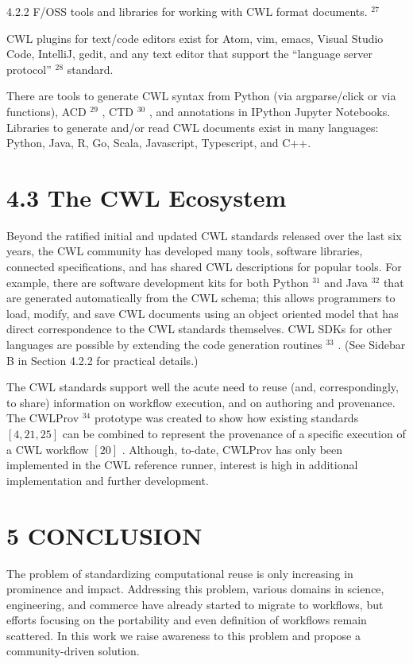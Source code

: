 \documentclass[
]{article}
\begin{document}
4.2.2 F/OSS tools and libraries for working with CWL format documents.
\(^{27}\)

CWL plugins for text/code editors exist for Atom, vim, emacs, Visual
Studio Code, IntelliJ, gedit, and any text editor that support the
``language server protocol'' \(^{28}\) standard.

There are tools to generate CWL syntax from Python (via argparse/click
or via functions), ACD \(^{29}\) , CTD \(^{30}\) , and annotations in
IPython Jupyter Notebooks. Libraries to generate and/or read CWL
documents exist in many languages: Python, Java, R, Go, Scala,
Javascript, Typescript, and C++.

\section{4.3 The CWL Ecosystem}\label{the-cwl-ecosystem}

Beyond the ratified initial and updated CWL standards released over the
last six years, the CWL community has developed many tools, software
libraries, connected specifications, and has shared CWL descriptions for
popular tools. For example, there are software development kits for both
Python \(^{31}\) and Java \(^{32}\) that are generated automatically
from the CWL schema; this allows programmers to load, modify, and save
CWL documents using an object oriented model that has direct
correspondence to the CWL standards themselves. CWL SDKs for other
languages are possible by extending the code generation routines
\(^{33}\) . (See Sidebar B in Section 4.2.2 for practical details.)

The CWL standards support well the acute need to reuse (and,
correspondingly, to share) information on workflow execution, and on
authoring and provenance. The CWLProv \(^{34}\) prototype was created to
show how existing standards \([4, 21, 25]\) can be combined to represent
the provenance of a specific execution of a CWL workflow \([20]\) .
Although, to-date, CWLProv has only been implemented in the CWL
reference runner, interest is high in additional implementation and
further development.

\section{5 CONCLUSION}\label{conclusion}

The problem of standardizing computational reuse is only increasing in
prominence and impact. Addressing this problem, various domains in
science, engineering, and commerce have already started to migrate to
workflows, but efforts focusing on the portability and even definition
of workflows remain scattered. In this work we raise awareness to this
problem and propose a community-driven solution.
\end{document}
